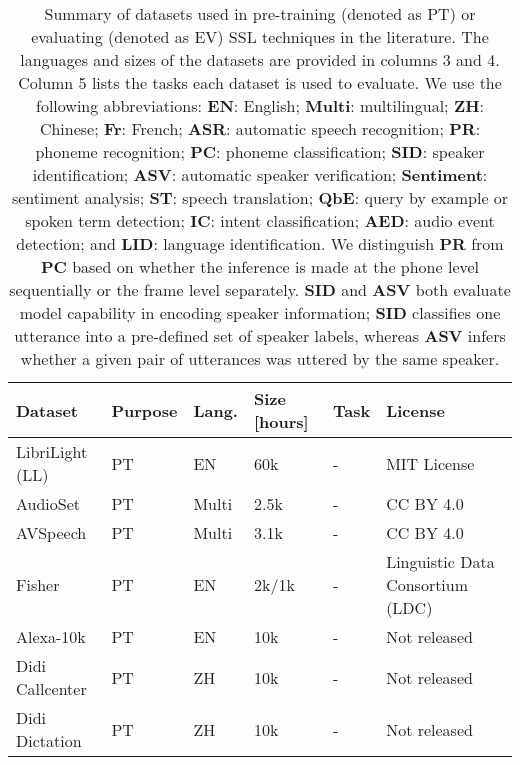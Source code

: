 \begin{table*}[ht]
  \centering
  \scriptsize %
  \caption{Summary of datasets used in pre-training (denoted as PT) or
  evaluating (denoted as EV) SSL techniques in the literature. The languages and
  sizes of the datasets are provided in columns 3 and 4. Column 5 lists the tasks each
  dataset is used to evaluate. We use the following abbreviations:
  \textbf{EN}: English; 
  \textbf{Multi}: multilingual;     %
  \textbf{ZH}: Chinese;
  \textbf{Fr}: French; \textbf{ASR}: automatic speech recognition; \textbf{PR}:
  phoneme recognition; \textbf{PC}: phoneme classification; \textbf{SID}:
  speaker identification; \textbf{ASV}: automatic speaker verification;
  \textbf{Sentiment}: sentiment analysis; \textbf{ST}: speech translation;
  \textbf{QbE}: query by example or spoken term detection; \textbf{IC}: intent
  classification; \textbf{AED}: audio event detection; and \textbf{LID}: language
  identification. We distinguish \textbf{PR} from \textbf{PC} based on whether
  the inference is made at the phone level sequentially or the frame level separately.
  \textbf{SID} and \textbf{ASV} both evaluate model capability in encoding
  speaker information; \textbf{SID} classifies one utterance into a pre-defined
  set of speaker labels, whereas \textbf{ASV} infers whether a given pair of
  utterances was uttered by the same speaker.}
  \label{table:datasets}
  {\renewcommand*\arraystretch{1.2}
  \begin{tabular}{llllll}
    \toprule
    Dataset & Purpose & Lang. & Size [hours] & Task & License \\
    \midrule
    LibriLight (LL) & PT & EN & 60k & - & MIT License \\ \hline
    AudioSet & PT & Multi & 2.5k & - & CC BY 4.0 \\ \hline %
    AVSpeech & PT & Multi & 3.1k & - & CC BY 4.0 \\ \hline %
    Fisher & PT & EN & 2k/1k \cite{jiang_further_2021}  & - & Linguistic Data Consortium (LDC) \\ \hline %

    Alexa-10k & PT & EN & 10k & - & Not released \\ \hline %
    Didi Callcenter & PT & ZH & 10k & - & Not released \\ \hline %
    Didi Dictation & PT & ZH & 10k & - & Not released \\ \hline %


\end{tabular}}
\end{table*}
